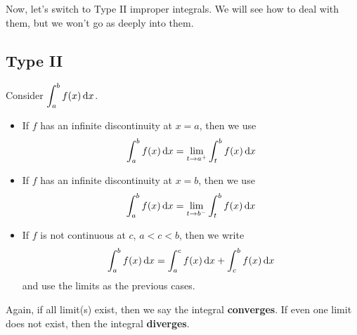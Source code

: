 Now, let's switch to Type II improper integrals. We will see how to deal with them, but we won't
go as deeply into them.

\subsection*{Type II}
Consider $ \displaystyle \int_{a}^{b} f(x)\odif{x}  $.
\begin{itemize}
    \item If $ f $ has an infinite discontinuity at $ x=a $, then we use
          \[ \int_{a}^{b} f(x)\odif{x} =\lim\limits_{{t} \to {a^+}} \int_{t}^{b} f(x)\odif{x} \]
    \item If $ f $ has an infinite discontinuity at $ x=b $, then we use
          \[ \int_{a}^{b} f(x)\odif{x} =\lim\limits_{{t} \to {b^-}} \int_{t}^{b} f(x)\odif{x} \]
    \item If $ f $ is not continuous at $ c $, $ a<c<b $, then we write
          \[  \int_{a}^{b} f(x)\odif{x} =\int_{a}^{c} f(x)\odif{x} +\int_{c}^{b} f(x)\odif{x} \]
          and use the limits as the previous cases.
\end{itemize}
Again, if all limit(s) exist, then we say the integral \textbf{converges}. If even one
limit does not exist, then the integral \textbf{diverges}.

